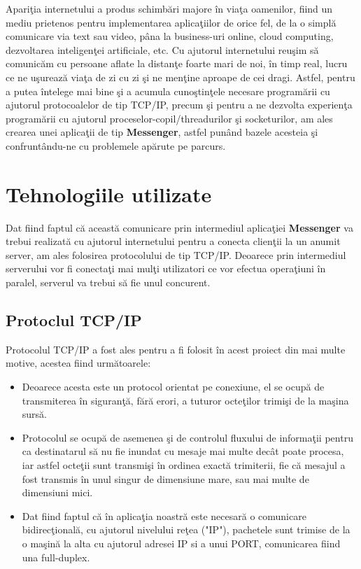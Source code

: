 \documentclass[runningheads]{llncs}
\begin{document}
Apari\c tia internetului a produs schimb\u ari majore \^ in via\c ta oamenilor, fiind un mediu prietenos pentru implementarea aplica\c tiilor de orice fel, de la o simpl\u a comunicare via text sau video, p\^ ana la business-uri online, cloud computing, dezvoltarea inteligen\c tei artificiale, etc. Cu ajutorul internetului reu\c sim s\u a comunic\u am cu persoane aflate la distan\c te foarte mari de noi, \^ in timp real, lucru ce ne u\c sureaz\u a via\c ta de zi cu zi \c si ne men\c tine aproape de cei dragi. Astfel, pentru a putea \^ intelege mai bine \c si a acumula cuno\c stin\c tele necesare program\u arii cu ajutorul protocoalelor de tip TCP/IP, precum \c si pentru a ne dezvolta experien\c ta program\u arii cu ajutorul proceselor-copil/threadurilor \c si socketurilor, am ales crearea unei aplica\c tii de tip {\bf Messenger}, astfel pun\^ and bazele acesteia \c si confrunt\^ andu-ne cu problemele ap\u arute pe parcurs.

\section{Tehnologiile utilizate}

Dat fiind faptul c\u a aceast\u a comunicare prin intermediul aplica\c tiei {\bf Messenger} va trebui realizat\u a cu ajutorul internetului pentru a conecta clien\c tii la un anumit server, am ales folosirea protocolului de tip TCP/IP. Deoarece prin intermediul serverului vor fi conecta\c ti mai mul\c ti utilizatori ce vor efectua opera\c tiuni \^ in paralel, serverul va trebui s\u a fie unul concurent.

\vspace{1cm}

\subsection{Protoclul TCP/IP}

Protocolul TCP/IP a fost ales pentru a fi folosit \^ in acest proiect din mai multe motive, acestea fiind urm\u atoarele:

\begin{itemize}
	\item Deoarece acesta este un protocol orientat pe conexiune, el se ocup\u a de transmiterea \^ in siguran\c t\u a, f\u ar\u a erori, a tuturor octe\c tilor trimi\c si de la ma\c sina surs\u a. 
	\newline
	\item Protocolul se ocup\u a de asemenea \c si de controlul fluxului de informa\c tii pentru ca destinatarul s\u a nu fie inundat cu mesaje mai multe dec\^ at poate procesa, iar astfel octe\c tii sunt transmi\c si \^ in ordinea exact\u a trimiterii, fie c\u a mesajul a fost transmis \^ in unul singur de dimensiune mare, sau mai multe de dimensiuni mici.
	\newline
	\item Dat fiind faptul c\u a \^ in aplica\c tia noastr\u a este necesar\u a o comunicare bidirec\c tional\u a, cu ajutorul nivelului re\c tea ("IP"), pachetele sunt trimise de la o ma\c sin\u a la alta cu ajutorul adresei IP si a unui PORT, comunicarea fiind una full-duplex.
\end{itemize}
\end{document}
